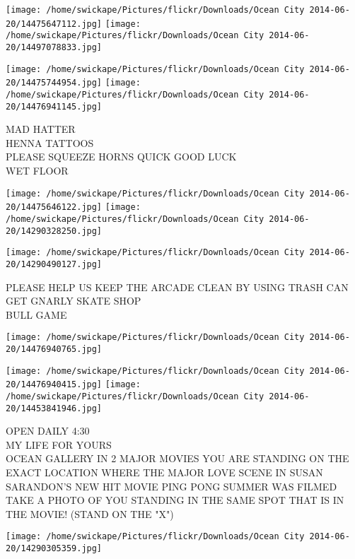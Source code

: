 \documentclass[10pt,letterpaper]{article}
\begin{document}
\texttt{[image: /home/swickape/Pictures/flickr/Downloads/Ocean City 2014-06-20/14475647112.jpg]}
\texttt{[image: /home/swickape/Pictures/flickr/Downloads/Ocean City 2014-06-20/14497078833.jpg]}

\texttt{[image: /home/swickape/Pictures/flickr/Downloads/Ocean City 2014-06-20/14475744954.jpg]}
\texttt{[image: /home/swickape/Pictures/flickr/Downloads/Ocean City 2014-06-20/14476941145.jpg]}

MAD HATTER\\
HENNA TATTOOS\\
PLEASE SQUEEZE HORNS QUICK GOOD LUCK\\
WET FLOOR\\
\pagebreak

\texttt{[image: /home/swickape/Pictures/flickr/Downloads/Ocean City 2014-06-20/14475646122.jpg]}
\texttt{[image: /home/swickape/Pictures/flickr/Downloads/Ocean City 2014-06-20/14290328250.jpg]}

\texttt{[image: /home/swickape/Pictures/flickr/Downloads/Ocean City 2014-06-20/14290490127.jpg]}

PLEASE HELP US KEEP THE ARCADE CLEAN BY USING TRASH CAN\\
GET GNARLY SKATE SHOP\\
BULL GAME\\
\pagebreak

\texttt{[image: /home/swickape/Pictures/flickr/Downloads/Ocean City 2014-06-20/14476940765.jpg]}

\vspace{0.25in}
\texttt{[image: /home/swickape/Pictures/flickr/Downloads/Ocean City 2014-06-20/14476940415.jpg]}
\texttt{[image: /home/swickape/Pictures/flickr/Downloads/Ocean City 2014-06-20/14453841946.jpg]}

OPEN DAILY 4:30\\
MY LIFE FOR YOURS\\
OCEAN GALLERY IN 2 MAJOR MOVIES YOU ARE STANDING ON THE EXACT LOCATION WHERE THE MAJOR LOVE SCENE IN SUSAN SARANDON'S NEW HIT MOVIE PING PONG SUMMER WAS FILMED TAKE A PHOTO OF YOU STANDING IN THE SAME SPOT THAT IS IN THE MOVIE!  (STAND ON THE "X")\\
\pagebreak

\texttt{[image: /home/swickape/Pictures/flickr/Downloads/Ocean City 2014-06-20/14290305359.jpg]}
\end{document}
